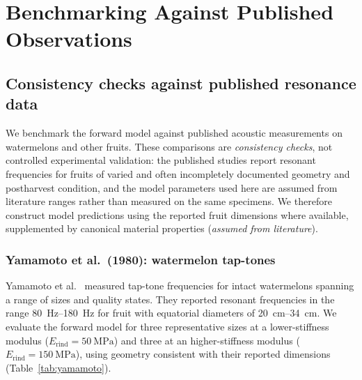 \section{Benchmarking Against Published Observations}
\label{sec:validation}

\subsection{Consistency checks against published resonance data}
\label{sec:published_data}

We benchmark the forward model against published acoustic measurements
on watermelons and other fruits.  These comparisons are
\emph{consistency checks}, not controlled experimental validation:
the published studies report resonant frequencies for fruits of varied
and often incompletely documented geometry and postharvest condition, and the model
parameters used here are assumed from literature ranges rather than
measured on the same specimens.  We therefore
construct model predictions using the reported fruit dimensions where
available, supplemented by canonical material properties
(\emph{assumed from literature}).

\subsubsection{Yamamoto et al.\ (1980): watermelon tap-tones}

Yamamoto et al.~\cite{Yamamoto1980} measured tap-tone frequencies for
intact watermelons spanning a range of sizes and quality states.  They
reported resonant frequencies in the range
\SIrange{80}{180}{\hertz} for fruit with equatorial diameters of
\SIrange{20}{34}{\centi\metre}.  We evaluate the forward model for
three representative sizes at a lower-stiffness modulus
($E_{\mathrm{rind}} = \SI{50}{\mega\pascal}$) and three at an
higher-stiffness modulus ($E_{\mathrm{rind}} = \SI{150}{\mega\pascal}$),
using geometry consistent with their reported dimensions
(Table~\ref{tab:yamamoto}).

